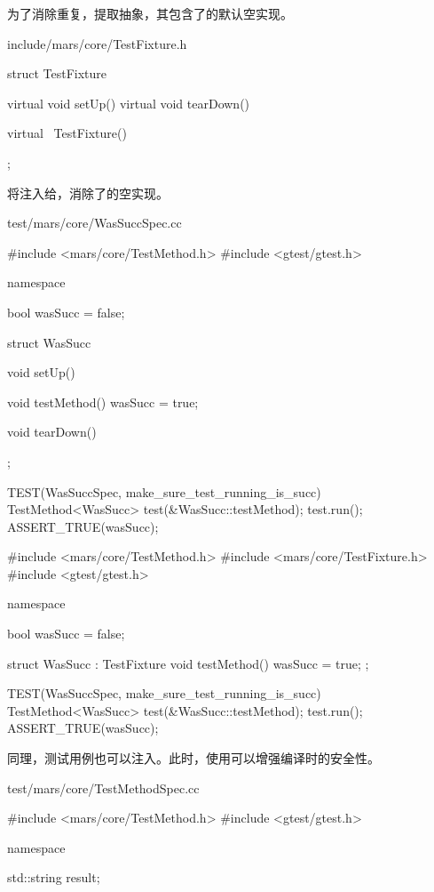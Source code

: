 \begin{content}
为了消除重复，提取抽象，其包含了的默认空实现。

\begin{nodiff}{include/mars/core/TestFixture.h}
\begin{c++}
struct TestFixture {
  virtual void setUp() {}
  virtual void tearDown() {}
  
  virtual ~TestFixture() {}
};
\end{c++}
\end{nodiff}

将注入给，消除了的空实现。

\begin{diff}{test/mars/core/WasSuccSpec.cc}
\begin{minicpp}
#include <mars/core/TestMethod.h>
#include <gtest/gtest.h>

namespace {
  bool wasSucc = false;

  struct WasSucc {
    void setUp() {
    }

    void testMethod() {
      wasSucc = true;
    }

    void tearDown() {
    }
  };
}

TEST(WasSuccSpec, make_sure_test_running_is_succ) {
  TestMethod<WasSucc> test(&WasSucc::testMethod);
  test.run();
  ASSERT_TRUE(wasSucc);
}
\end{minicpp}
\tcblower
\begin{minicpp}
#include <mars/core/TestMethod.h>
#include <mars/core/TestFixture.h>
#include <gtest/gtest.h>

namespace {
  bool wasSucc = false;

  struct WasSucc : TestFixture {
    void testMethod() {
      wasSucc = true;
    }
  };
}

TEST(WasSuccSpec, make_sure_test_running_is_succ) {
  TestMethod<WasSucc> test(&WasSucc::testMethod);
  test.run();
  ASSERT_TRUE(wasSucc);
}
\end{minicpp}
\end{diff}

同理，测试用例也可以注入。此时，使用可以增强编译时的安全性。

\begin{diff}{test/mars/core/TestMethodSpec.cc}
\begin{minicpp}
#include <mars/core/TestMethod.h>
#include <gtest/gtest.h>

namespace {
  std::string result;

}
\end{minicpp}
\end{diff}
\end{content}
